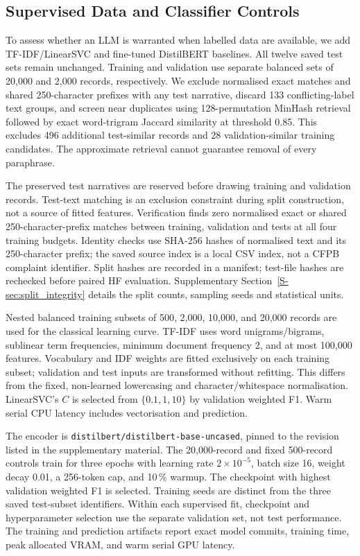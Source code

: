 \subsection{Supervised Data and Classifier Controls}
\label{sec:supervised_methods}

To assess whether an LLM is warranted when labelled data are available,
we add TF-IDF/LinearSVC and fine-tuned DistilBERT
\cite{sanh2019distilbert} baselines. All twelve saved test sets remain
unchanged. Training and validation use separate balanced sets of
20,000 and 2,000 records, respectively. We exclude normalised exact
matches and shared 250-character prefixes with any test narrative,
discard 133 conflicting-label text groups, and screen near duplicates
using 128-permutation MinHash retrieval followed by exact word-trigram
Jaccard similarity at threshold 0.85. This excludes 496 additional
test-similar records and 28 validation-similar training candidates.
The approximate retrieval cannot guarantee removal of every paraphrase.

The preserved test narratives are reserved before drawing training and
validation records. Test-text matching is an exclusion constraint during
split construction, not a source of fitted features. Verification finds
zero normalised exact or shared 250-character-prefix matches between
training, validation and tests at all four training budgets. Identity checks
use SHA-256 hashes of normalised text and its 250-character prefix;
the saved source index is a local CSV index, not a CFPB complaint identifier.
Split hashes are recorded in a manifest; test-file hashes are rechecked
before paired HF evaluation. Supplementary Section~\ref{S-sec:split_integrity}
details the split counts, sampling seeds and statistical units.

Nested balanced training subsets of 500, 2,000, 10,000, and 20,000
records are used for the classical learning curve. TF-IDF uses word
unigrams/bigrams, sublinear term frequencies, minimum document
frequency 2, and at most 100,000 features. Vocabulary and IDF weights
are fitted exclusively on each training subset; validation and test
inputs are transformed without refitting. This differs from the fixed,
non-learned lowercasing and character/whitespace normalisation.
LinearSVC's $C$ is selected
from $\{0.1,1,10\}$ by validation weighted F1. Warm serial CPU latency includes vectorisation and prediction.

The encoder is \texttt{distilbert/distilbert-base-uncased}, pinned to
the revision listed in the supplementary material. The 20,000-record
and fixed 500-record controls train for three epochs with learning rate
$2\times10^{-5}$, batch size 16, weight decay 0.01, a 256-token cap,
and 10\,\% warmup.
The checkpoint with highest validation weighted F1 is selected.
Training seeds are distinct from the three saved test-subset identifiers.
Within each supervised fit, checkpoint and hyperparameter selection
use the separate validation set, not test performance.
The training and prediction artifacts report exact model commits,
training time, peak allocated VRAM, and warm serial GPU latency.

